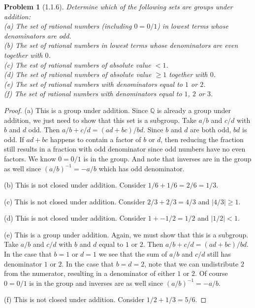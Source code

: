 \documentclass{article}
\newtheorem{problem}{Problem}
\begin{document}
\begin{problem}[1.1.6]
Determine which of the following sets are groups under addition:\\
(a) The set of rational numbers (including $0 = 0/1$) in lowest terms whose denominators are odd.\\
(b) The set of rational numbers in lowest terms whose denominators are even together with $0$.\\
(c) The est of rational numbers of absolute value $< 1$.\\
(d) The set of rational numbers of absolute value $\geq 1$ together with $0$.\\
(e) The set of rational numbers with denominators equal to $1$ or $2$.\\
(f) The set of rational numbers with denominators equal to $1$, $2$ or $3$.
\end{problem}
\begin{proof}
(a) This is a group under addition. Since $\mathbb{Q}$ is already a group under addition, we just need to show that this set is a subgroup. Take $a/b$ and $c/d$ with $b$ and $d$ odd. Then $a/b + c/d = (ad + bc)/bd$. Since $b$ and $d$ are both odd, $bd$ is odd. If $ad + bc$ happens to contain a factor of $b$ or $d$, then reducing the fraction still results in a fraction with odd denominator since odd numbers have no even factors. We know $0 = 0/1$ is in the group. And note that inverses are in the group as well since $(a/b)^{-1} = -a/b$ which has odd denominator.

(b) This is not closed under addition. Consider $1/6 + 1/6 = 2/6 = 1/3$.

(c) This is not closed under addition. Consider $2/3 + 2/3 = 4/3$ and $|4/3| \geq 1$.

(d) This is not closed under addition. Consider $1 + -1/2 = 1/2$ and $|1/2| < 1$.

(e) This is a group under addition. Again, we must show that this is a subgroup. Take $a/b$ and $c/d$ with $b$ and $d$ equal to $1$ or $2$. Then $a/b + c/d = (ad + bc)/bd$. In the case that $b=1$ or $d=1$ we see that the sum of $a/b$ and $c/d$ still has denominator $1$ or $2$. In the case that $b = d = 2$, note that we can undistribute $2$ from the numerator, resulting in a denominator of either $1$ or $2$. Of course $0 = 0/1$ is in the group and inverses are as well since $(a/b)^{-1} = -a/b$.

(f) This is not closed under addition. Consider $1/2 + 1/3 = 5/6$.
\end{proof}
\end{document}
